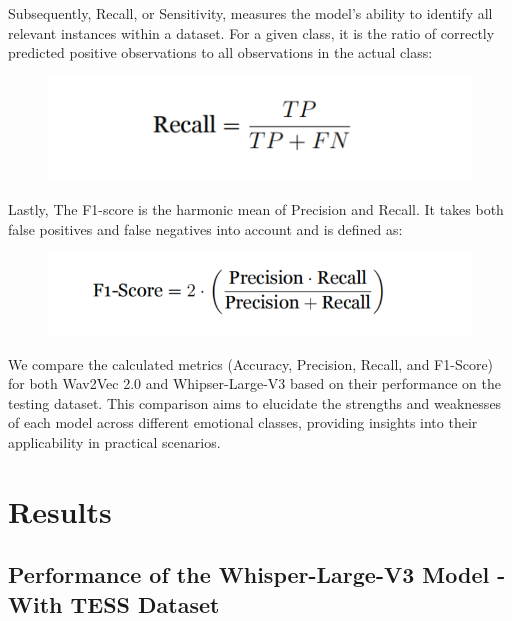 \documentclass[a4paper,12pt]{article}
\begin{document}
Subsequently, Recall, or Sensitivity, measures the model’s ability to identify all relevant instances within a dataset. For a given class, it is the ratio of correctly predicted positive observations to all observations in the actual class:
\begin{figure}[H]
    \centering
    \includegraphics[width=.6\linewidth]{Recall.png}
\end{figure}


Lastly, The F1-score is the harmonic mean of Precision and Recall. It takes both false positives and false negatives into account and is defined as:

\begin{figure}[H]
    \centering
    \includegraphics[width=0.7\linewidth]{F1Score.png}
\end{figure}
We compare the calculated metrics (Accuracy, Precision, Recall, and F1-Score) for both Wav2Vec 2.0 and Whipser-Large-V3 based on their performance on the testing dataset. This comparison aims to elucidate the strengths and weaknesses of each model across different emotional classes, providing insights into their applicability in practical scenarios.


\newpage
\section{Results}
\subsection{Performance of the Whisper-Large-V3 Model - With TESS Dataset}
\end{document}
